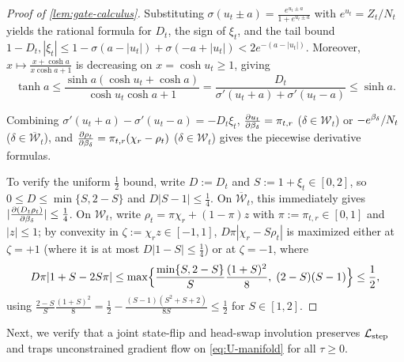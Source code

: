 \begin{proof}[Proof of \cref{lem:gate-calculus}]
Substituting $\sigma(u_t \pm a) = \frac{e^{u_t\pm a}}{1 + e^{u_t\pm a}}$ with $e^{u_t} = Z_t/N_t$ yields the rational formula for $D_t$, the sign of $\xi_t$, and the tail bound $1 - D_t, |\xi_t| \le 1 - \sigma(a - |u_t|) + \sigma(-a + |u_t|) < 2e^{-(a - |u_t|)}$. Moreover, $x \mapsto \frac{x + \cosh a}{x\cosh a + 1}$ is decreasing on $x = \cosh u_t \ge 1$, giving
\[
  \tanh a \le \frac{\sinh a(\cosh u_t + \cosh a)}{\cosh u_t\cosh a + 1} = \frac{D_t}{\sigma'(u_t+a)+\sigma'(u_t-a)} \le \sinh a.
\]

Combining $\sigma'(u_t + a) - \sigma'(u_t - a) = -D_t\xi_t$, $\pd{u_t}{\brel_\delta} = \pi_{t,r}$ ($\delta \in \mathcal W_t$) or $-e^{\beta_\delta}/N_t$ ($\delta \in \overline{\mathcal W}_t$), and $\pd{\rho_t}{\brel_\delta} = \pi_{t,r}(\chi_r - \rho_t)$ ($\delta \in \mathcal W_t$) gives the piecewise derivative formulas.

To verify the uniform $\frac{1}{2}$ bound, write $D := D_t$ and $S := 1 + \xi_t \in [0, 2]$, so $0 \le D \le \min\{S, 2 - S\}$ and $D|S - 1| \le \frac{1}{4}$. On $\overline{\mathcal W}_t$, this immediately gives $|\pd{(D_t\rho_t)}{\brel_\delta}| \le \frac{1}{4}$. On $\mathcal W_t$, write $\rho_t = \pi\chi_r + (1 - \pi)z$ with $\pi := \pi_{t,r} \in [0,1]$ and $|z| \le 1$; by convexity in $\zeta := \chi_r z \in [-1, 1]$, $D\pi|\chi_r - S\rho_t|$ is maximized either at $\zeta = +1$ (where it is at most $D|1 - S| \le \frac{1}{4}$) or at $\zeta = -1$, where
\[
  D\pi\lvert 1 + S - 2S\pi\rvert
  \le \max\Bigl\{\frac{\min\{S, 2-S\}}{S}\frac{(1+S)^2}{8},\; (2 - S)(S - 1)\Bigr\}
  \le \frac{1}{2},
\]
using $\frac{2-S}{S}\frac{(1+S)^2}{8} = \frac{1}{2} - \frac{(S-1)(S^2+S+2)}{8S} \le \frac{1}{2}$ for $S \in [1, 2]$.
\end{proof}

Next, we verify that a joint state-flip and head-swap involution preserves $\mathcal L_{\mathrm{step}}$ and traps unconstrained gradient flow on \cref{eq:U-manifold} for all $\tau \ge 0$.

